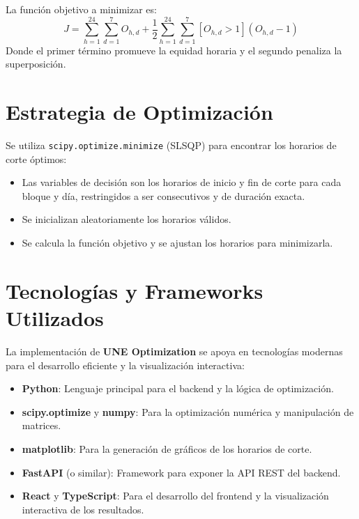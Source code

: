 \documentclass[a4paper,12pt]{article}
\begin{document}
La función objetivo a minimizar es:
\begin{equation}
J = \sum_{h=1}^{24} \sum_{d=1}^7 O_{h,d} + \frac{1}{2} \sum_{h=1}^{24} \sum_{d=1}^7 [O_{h,d} > 1] (O_{h,d} - 1)
\end{equation}
Donde el primer término promueve la equidad horaria y el segundo penaliza la superposición.

\section{Estrategia de Optimización}
Se utiliza \texttt{scipy.optimize.minimize} (SLSQP) para encontrar los horarios de corte óptimos:
\begin{itemize}
    \item Las variables de decisión son los horarios de inicio y fin de corte para cada bloque y día, restringidos a ser consecutivos y de duración exacta.
    \item Se inicializan aleatoriamente los horarios válidos.
    \item Se calcula la función objetivo y se ajustan los horarios para minimizarla.
\end{itemize}

\section{Tecnologías y Frameworks Utilizados}
La implementación de \textbf{UNE Optimization} se apoya en tecnologías modernas para el desarrollo eficiente y la visualización interactiva:
\begin{itemize}
    \item \textbf{Python}: Lenguaje principal para el backend y la lógica de optimización.
    \item \textbf{scipy.optimize} y \textbf{numpy}: Para la optimización numérica y manipulación de matrices.
    \item \textbf{matplotlib}: Para la generación de gráficos de los horarios de corte.
    \item \textbf{FastAPI} (o similar): Framework para exponer la API REST del backend.
    \item \textbf{React} y \textbf{TypeScript}: Para el desarrollo del frontend y la visualización interactiva de los resultados.
\end{itemize}
\end{document}
